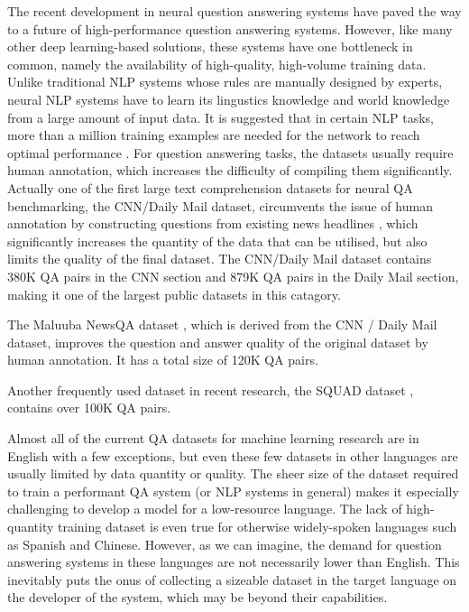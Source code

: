 \documentclass[]{article}
\begin{document}
The recent development in neural question answering systems have paved the way to a future of high-performance question answering systems. However, like many other deep learning-based solutions, these systems have one bottleneck in common, namely the availability of high-quality, high-volume training data. Unlike traditional NLP systems whose rules are manually designed by experts, neural NLP systems have to learn its lingustics knowledge and world knowledge from a large amount of input data. It is suggested that in certain NLP tasks, more than a million training examples are needed for the network to reach optimal performance \cite{banko2001mitigating}. 
For question answering tasks, the datasets usually require human annotation, which increases the difficulty of compiling them significantly. Actually one of the first large text comprehension datasets for neural QA benchmarking, the CNN/Daily Mail dataset, circumvents the issue of human annotation by constructing questions from existing news headlines \cite{hermann2015teaching}, which significantly increases the quantity of the data that can be utilised, but also limits the quality of the final dataset. The CNN/Daily Mail dataset contains 380K QA pairs in the CNN section and 879K QA pairs in the Daily Mail section, making it one of the largest public datasets in this catagory.

The Maluuba NewsQA dataset \cite{trischler2016newsqa}, which is derived from the CNN / Daily Mail dataset, improves the question and answer quality of the original dataset by human annotation. It has a total size of 120K QA pairs.

Another frequently used dataset in recent research, the SQUAD dataset \cite{rajpurkar2016squad}, contains over 100K QA pairs.

Almost all of the current QA datasets for machine learning research are in English with a few exceptions, but even these few datasets in other languages are usually
limited by data quantity or quality. The sheer size of the dataset required to train a performant QA system (or NLP systems in general) makes it especially challenging to develop a model for a low-resource language. The lack of high-quantity training dataset is even true for otherwise widely-spoken languages such as Spanish and Chinese. However, as we can imagine, the demand for question answering systems in these languages are not necessarily lower than English. This inevitably puts the onus of collecting a sizeable dataset in the target language on the developer of the system, which may be beyond their capabilities.
\end{document}
